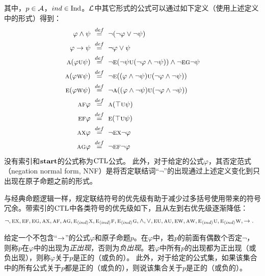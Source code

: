 其中，$p\in {\cal A}$，$ind \in \textrm{Ind}$。$\cal L$中其它形式的公式可以通过如下定义（使用上述定义中的形式）得到：
\begin{alignat}{2}
	\varphi \wedge \psi& \ \overset{def}{=}\ \neg (\neg \varphi \vee \neg \psi)\\
	\varphi \rto \psi& \ \overset{def}{=}\ \neg \varphi \vee \psi\\
	\ALL(\varphi \UNTILL \psi)& \ \overset{def}{=}\ \neg\EXIST(\neg \psi \UNTILL(\neg \varphi \wedge \neg \psi)) \wedge \neg \EXIST \GLOBAL \neg \psi\\
	\ALL(\varphi \UNLESS \psi)& \ \overset{def}{=}\  \neg\EXIST((\varphi \wedge \neg \psi) \UNTILL (\neg \varphi \wedge \neg \psi))\\
	\EXIST(\varphi \UNLESS \psi)& \ \overset{def}{=}\  \neg\ALL((\varphi \wedge \neg \psi) \UNTILL (\neg \varphi \wedge \neg \psi))\\
	\ALL\FUTURE \varphi& \ \overset{def}{=}\ 	\ALL(\top \UNTILL \psi)\\
	\EXIST\FUTURE \varphi& \ \overset{def}{=}\ \EXIST(\top \UNTILL \psi)\\
	\ALL \NEXT \varphi& \ \overset{def}{=}\  \neg \EXIST \NEXT \neg \varphi\\
	\ALL \GLOBAL \varphi& \ \overset{def}{=}\  \neg \EXIST \FUTURE \neg \varphi
\end{alignat}
没有索引和$\textbf{start}$的公式称为$\textrm{CTL}$公式。
此外，对于给定的公式$\varphi$，其否定范式（negation normal form, NNF）是将否定联结词“$\neg$”的出现通过上述定义变化到只出现在原子命题之前的形式。

与经典命题逻辑一样，规定联结符号的优先级有助于减少过多括号使用带来的符号冗余。带索引的$\textrm{CTL}$中各类符号的优先级如下，且从左到右优先级逐渐降低：
\begin{align*}
	& \neg, \textsc{e}\textsc{x}, \textsc{e}\textsc{f}, \textsc{e}\textsc{g}, \textsc{a}\textsc{x}, \textsc{a}\textsc{f}, \textsc{a}\textsc{g}, \textsc{e}_{{\langle{ind}\rangle}}\textsc{x}, \textsc{e}_{{\langle{ind}\rangle}}\textsc{f}, \textsc{e}_{{\langle{ind}\rangle}}\textsc{g}
	,\land, \lor,
	 \textsc{e}\textsc{u}, \textsc{a}\textsc{u}, \textsc{e} \textsc{w}, \textsc{a}\textsc{w}, \textsc{e}_{{\langle{ind}\rangle}}\textsc{u}, \textsc{e}_{{\langle{ind}\rangle}} \textsc{w}, \rightarrow.
\end{align*}

给定一个不包含“$\rightarrow$”的公式$\varphi$和原子命题$p$。在$\varphi$中，若$p$的前面有偶数个否定$\neg$，
则称$p$在$\varphi$中的出现为\emph{正出现}，否则为\emph{负出现}。若$\varphi$中所有$p$的出现都为正出现（或负出现），则称$\varphi$关于$p$是正的（或负的）。
此外，对于给定的公式集，如果该集合中的所有公式关于$p$都是正的（或负的），则说该集合关于$p$是正的（或负的）。

